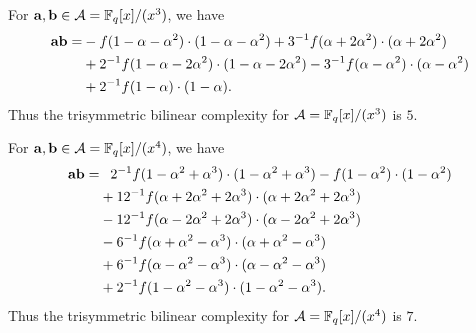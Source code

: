\documentclass[a4paper,11pt]{article}
\begin{document}
For $\mathbf{a}, \mathbf{b}\in\mathcal{A}=\mathbb{F}_{q}[x]/(x^3)$, we have
\begin{equation*}
  \begin{split}
  \mathbf{a}\mathbf{b} =&
  -f(1-\alpha-\alpha^2)\cdot(1-\alpha-\alpha^2)+3^{-1}f(\alpha+2\alpha^2)\cdot(\alpha+2\alpha^2)\\
  &+2^{-1}f(1-\alpha-2\alpha^2)\cdot(1-\alpha-2\alpha^2) -
  3^{-1}f(\alpha-\alpha^2)\cdot(\alpha-\alpha^2)\\
  &+2^{-1}f(1-\alpha)\cdot(1-\alpha).
  \end{split}
\end{equation*}
Thus the trisymmetric bilinear complexity for $\mathcal{A}=\mathbb{F}_q[x]/(x^3)$ is $5$.

For $\mathbf{a}, \mathbf{b}\in\mathcal{A}=\mathbb{F}_{q}[x]/(x^4)$, we have
\begin{equation*}
  \begin{split}
    \mathbf{a}\mathbf{b} =&\phantom{+}2^{-1}f(1-\alpha^2+\alpha^3)\cdot(1-\alpha^2+\alpha^3)-f(1-\alpha^2)\cdot(1-\alpha^2)\\
  &+12^{-1}f(\alpha+2\alpha^2+2\alpha^3)\cdot(\alpha+2\alpha^2+2\alpha^3)\\
  &-12^{-1}f(\alpha-2\alpha^2+2\alpha^3)\cdot(\alpha-2\alpha^2+2\alpha^3)\\
  &-6^{-1}f(\alpha+\alpha^2-\alpha^3)\cdot(\alpha+\alpha^2-\alpha^3)\\
  &+6^{-1}f(\alpha-\alpha^2-\alpha^3)\cdot(\alpha-\alpha^2-\alpha^3)\\
  &+2^{-1}f(1-\alpha^2-\alpha^3)\cdot(1-\alpha^2-\alpha^3).
  \end{split}
\end{equation*}
Thus the trisymmetric bilinear complexity for $\mathcal{A}=\mathbb{F}_q[x]/(x^4)$ is $7$.





\end{document}
